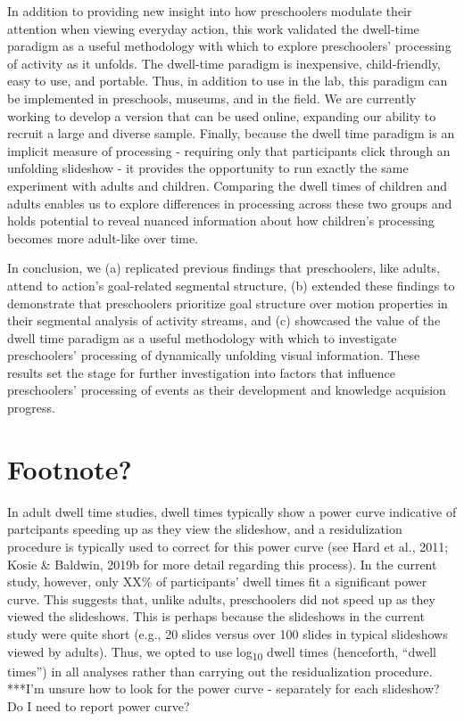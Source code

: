 \documentclass[
  english,
  man,floatsintext]{apa6}
\begin{document}
In addition to providing new insight into how preschoolers modulate their attention when viewing everyday action, this work validated the dwell-time paradigm as a useful methodology with which to explore preschoolers' processing of activity as it unfolds. The dwell-time paradigm is inexpensive, child-friendly, easy to use, and portable. Thus, in addition to use in the lab, this paradigm can be implemented in preschools, museums, and in the field. We are currently working to develop a version that can be used online, expanding our ability to recruit a large and diverse sample. Finally, because the dwell time paradigm is an implicit measure of processing - requiring only that participants click through an unfolding slideshow - it provides the opportunity to run exactly the same experiment with adults and children. Comparing the dwell times of children and adults enables us to explore differences in processing across these two groups and holds potential to reveal nuanced information about how children's processing becomes more adult-like over time.

In conclusion, we (a) replicated previous findings that preschoolers, like adults, attend to action's goal-related segmental structure, (b) extended these findings to demonstrate that preschoolers prioritize goal structure over motion properties in their segmental analysis of activity streams, and (c) showcased the value of the dwell time paradigm as a useful methodology with which to investigate preschoolers' processing of dynamically unfolding visual information. These results set the stage for further investigation into factors that influence preschoolers' processing of events as their development and knowledge acquision progress.

\hypertarget{footnote}{%
\section{Footnote?}\label{footnote}}

In adult dwell time studies, dwell times typically show a power curve indicative of partcipants speeding up as they view the slideshow, and a residulization procedure is typically used to correct for this power curve (see Hard et al., 2011; Kosie \& Baldwin, 2019b for more detail regarding this process). In the current study, however, only XX\% of participants' dwell times fit a significant power curve. This suggests that, unlike adults, preschoolers did not speed up as they viewed the slideshows. This is perhaps because the slideshows in the current study were quite short (e.g., 20 slides versus over 100 slides in typical slideshows viewed by adults). Thus, we opted to use log\textsubscript{10} dwell times (henceforth, ``dwell times'') in all analyses rather than carrying out the residualization procedure. ***I'm unsure how to look for the power curve - separately for each slideshow? Do I need to report power curve?
\end{document}
